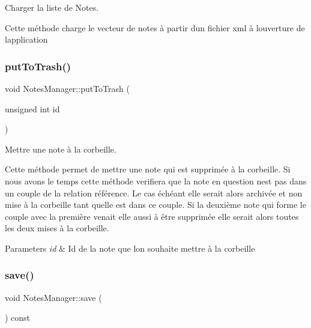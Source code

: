 Charger la liste de Notes. 

Cette méthode charge le vecteur de notes à partir d\textquotesingle{}un fichier xml à l\textquotesingle{}ouverture de l\textquotesingle{}application \mbox{\label{class_notes_manager_a69ef4ff2eb05ec962c7f8cb80d0d15d3}} 
\subsubsection{\texorpdfstring{put\+To\+Trash()}{putToTrash()}}
{\footnotesize\ttfamily void Notes\+Manager\+::put\+To\+Trash (\begin{DoxyParamCaption}\item[{unsigned int}]{id }\end{DoxyParamCaption})}



Mettre une note à la corbeille. 

Cette méthode permet de mettre une note qui est supprimée à la corbeille. Si nous avons le temps cette méthode verifiera que la note en question n\textquotesingle{}est pas dans un couple de la relation référence. Le cas échéant elle serait alors archivée et non mise à la corbeille tant qu\textquotesingle{}elle est dans ce couple. Si la deuxième note qui forme le couple avec la première venait elle aussi à être supprimée elle serait alors toutes les deux mises à la corbeille. 
\begin{DoxyParams}{Parameters}
{\em id} & Id de la note que l\textquotesingle{}on souhaite mettre à la corbeille \\
\hline
\end{DoxyParams}
\mbox{\label{class_notes_manager_ad271bd7f8079b01b04a32b886b498bac}} 
\subsubsection{\texorpdfstring{save()}{save()}}
{\footnotesize\ttfamily void Notes\+Manager\+::save (\begin{DoxyParamCaption}{ }\end{DoxyParamCaption}) const}



